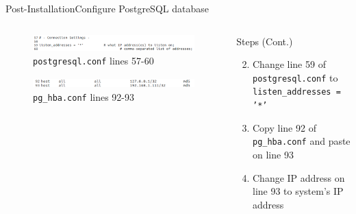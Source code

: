 \documentclass{beamer}
\begin{document}
\begin{frame}{Post-Installation}{Configure PostgreSQL database}
\begin{columns}[T]
\begin{column}{0.5\textwidth}
	\begin{figure}
		\includegraphics[scale=0.2]{../figs/postgresqlChange.png}
		\caption{\texttt{postgresql.conf} lines 57-60}
	\end{figure}
	\begin{figure}
		\includegraphics[scale=0.2]{../figs/pg_hbaChange.png}
		\caption{\texttt{pg\_hba.conf} lines 92-93}
	\end{figure}
\end{column}
\begin{column}{0.5\textwidth}
	\begin{block}{Steps (Cont.)}
		\begin{enumerate}
			\setcounter{enumi}{1}
			\item Change line 59 of \texttt{postgresql.conf} to \texttt{listen\_addresses = '*'}

			\item Copy line 92 of \texttt{pg\_hba.conf} and paste on line 93
			\item Change IP address on line 93 to system's IP address
		\end{enumerate}
	\end{block}		
\end{column}
\end{columns}
\end{frame}
\end{document}
